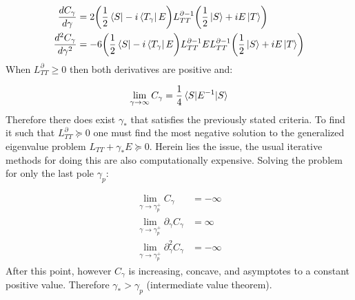 \documentclass[twocolumn]{revtex4-2}
\begin{document}
\begin{align*}
\frac{dC_\gamma}{d\gamma} &= 2\qty(\frac{1}{2}\bra{S} - i\bra{T_\gamma}E)L^{\partial -1}_{TT}\qty(\frac{1}{2}\ket{S} + iE\ket{T})\\
\frac{d^2C_\gamma}{d\gamma^2} &= -6\qty(\frac{1}{2}\bra{S} - i\bra{T_\gamma}E)L^{\partial -1}_{TT} E L^{\partial -1}_{TT}\qty(\frac{1}{2}\ket{S} + iE\ket{T})
\end{align*}
When $L^\partial_{TT}\ge 0$ then both derivatives are positive and:

\begin{align*}
\lim_{\gamma\rightarrow\infty}C_\gamma = \frac{1}{4}\ev{E^{-1}}{S}
\end{align*}
Therefore there does exist $\gamma_*$ that satisfies the previously stated criteria. To find it such that $L^\partial_{TT}\succcurlyeq 0$ one must find the most negative solution to the generalized eigenvalue problem $L_{TT} + \gamma_* E\succcurlyeq 0$. Herein lies the issue, the usual iterative methods for doing this are also computationally expensive. Solving the problem for only the last pole $\gamma_p$:

\begin{align*}
\lim_{\gamma\rightarrow\gamma_p^+}C_\gamma &= -\infty\\
\lim_{\gamma\rightarrow\gamma_p^+}\partial_\gamma C_\gamma &= \infty\\
\lim_{\gamma\rightarrow\gamma_p^+}\partial_\gamma^2C_\gamma &= -\infty
\end{align*}
After this point, however $C_\gamma$ is increasing, concave, and asymptotes to a constant positive value. Therefore $\gamma_*>\gamma_p$ (intermediate value theorem).
\end{document}

